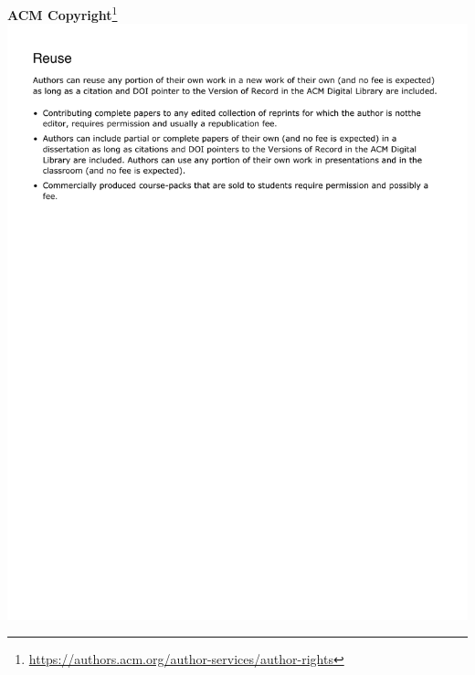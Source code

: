 \documentclass{uicthesi}
\begin{document}







\appendices
\newpage
\appendix




\newpage
\textbf{ACM Copyright}\footnote{\url{https://authors.acm.org/author-services/author-rights}}\\
\includegraphics[width=5.5in]{copyright/acm.pdf}




\end{document}
